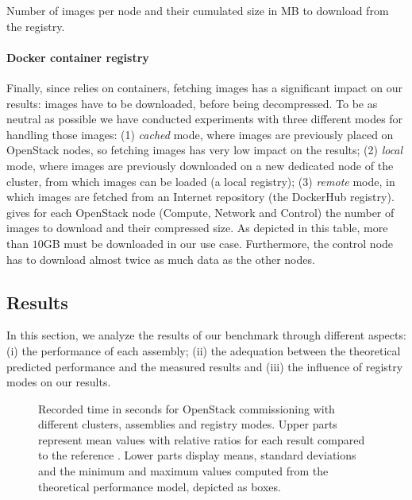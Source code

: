 \begin{table}
  \begin{center}
    
    \caption{Number of \docker images per node and their cumulated size in MB to
      download from the registry.}
    \label{tab:images}
  \end{center}
\end{table}

\paragraph{Docker container registry}
Finally, since \kolla relies on \docker containers, fetching \docker
images has a significant impact on our results: images have to be
downloaded, before being decompressed. To be as neutral as possible we
have conducted experiments with three different modes for handling
those images: (1) \emph{cached} mode, where images are previously
placed on OpenStack nodes, so fetching \docker images has very low impact on
the results; (2) \emph{local} mode, where images are previously
downloaded on a new dedicated node of the cluster, from which images
can be loaded (\ie a local \docker registry); (3) \emph{remote} mode,
in which images are fetched from an Internet repository (\ie the
DockerHub registry).  gives for each OpenStack node
(\ie Compute, Network and Control) the number of \docker images to
download and their compressed size.  As depicted in this table, more
than $10$GB must be downloaded in our use case.  Furthermore, the
control node has to download almost twice as much data as the other
nodes.

\subsection{Results}

In this section, we analyze the results of our benchmark through
different aspects: (i) the performance of each assembly; (ii) the
adequation between the theoretical predicted performance and the
measured results and (iii) the influence of registry modes on our
results.

\begin{figure}[t!]
  \begin{center}
    \def\svgwidth{\columnwidth}
    \def\svgwidth{\columnwidth}
    \caption{Recorded time in seconds for OpenStack commissioning with
      different clusters, assemblies and registry modes. Upper parts
      represent mean values with relative ratios for each result
      compared to the reference \ansass.  Lower parts display means,
      standard deviations and the minimum and maximum values computed
      from the theoretical performance model, depicted as boxes.}
    \label{fig:openstack_results}
  \end{center}
\end{figure}

